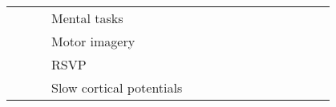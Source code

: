 \begin{tabular}{p{1.5cm}p{1.5cm}p{1.5cm}p{1.5cm}p{0.6cm}p{0.6cm}p{0.6cm}p{0.6cm}p{0.6cm}p{0.6cm}p{0.6cm}p{0.6cm}p{0.6cm}p{0.6cm}p{0.6cm}}
                                &                 &                   & Mental tasks &                                                             &                                                                                                                             &                                                                        &                                      &                                       \cite{Padmanabh2017} &                      &                         &                               &                     &                         &                                        \cite{Hasib2018, Patnaik2017} \\
                                &                 &                   & Motor imagery &                                   \cite{Zhang2017a, Li2014} &  \cite{Gao2018, Sakhavi2017, Tang2017, Schirrmeister2017, Dharamsi2017, Loshchilov2017, Tabar2016a, Sakhavi2015, Yang2015a} &                                                      \cite{Zhang2018c} &                        \cite{An2014} &  \cite{Chiarelli2018, Major2017, Alomari2013, Mohamed2011} &                      &                         &            \cite{Normand2015} &   \cite{Zhang2017g} &                         &                                            \cite{Zhang2017d, Bu2010} \\
                                &                 &                   & RSVP &                                                             &                                                                                                         \cite{Shamwell2016} &                                                                        &                                      &                                                            &                      &                         &                               &                     &                         &                                                                      \\
                                &                 &                   & Slow cortical potentials &                                                             &                                                                                                                             &                                                                        &                                      &                                                            &                      &                         &               \cite{Ding2015} &                     &                         &                                                                      \\

\end{tabular}
